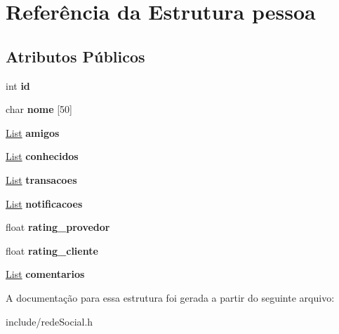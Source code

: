\hypertarget{structpessoa}{}\section{Referência da Estrutura pessoa}
\label{structpessoa}
\subsection*{Atributos Públicos}
\begin{DoxyCompactItemize}
\item 
\mbox{\label{structpessoa_a8e80bd7d70d7d29b248ef5ec77720b5b}} 
int {\bfseries id}
\item 
\mbox{\label{structpessoa_aab3d539801c72b8740e5467b0cf86839}} 
char {\bfseries nome} \mbox{[}50\mbox{]}
\item 
\mbox{\label{structpessoa_a4eea379bf9c4b63980b2b7b9eb5523cb}} 
\hyperlink{structlistNode}{List} {\bfseries amigos}
\item 
\mbox{\label{structpessoa_a4a0912ceba3d7877996a51dcfd373ce8}} 
\hyperlink{structlistNode}{List} {\bfseries conhecidos}
\item 
\mbox{\label{structpessoa_ad9d343133c3f26aaad1b8e2656235b3d}} 
\hyperlink{structlistNode}{List} {\bfseries transacoes}
\item 
\mbox{\label{structpessoa_a62d9fd43b7e6149b1ad85c7bb1ffa5c4}} 
\hyperlink{structlistNode}{List} {\bfseries notificacoes}
\item 
\mbox{\label{structpessoa_a6aef9f983e1a00eb20e0b4227df8e963}} 
float {\bfseries rating\+\_\+provedor}
\item 
\mbox{\label{structpessoa_afee04df44de2997fa213bbdc1a24a5c0}} 
float {\bfseries rating\+\_\+cliente}
\item 
\mbox{\label{structpessoa_a04fa228b9b6f71210dae022b62fd5fab}} 
\hyperlink{structlistNode}{List} {\bfseries comentarios}
\end{DoxyCompactItemize}


A documentação para essa estrutura foi gerada a partir do seguinte arquivo\+:\begin{DoxyCompactItemize}
\item 
include/rede\+Social.\+h\end{DoxyCompactItemize}
